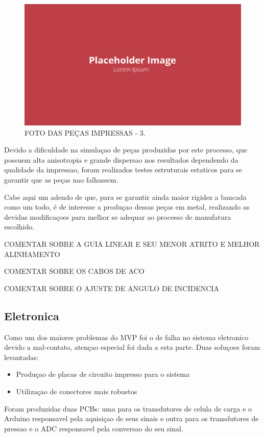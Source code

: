 \begin{figure}[!ht]
    \centering
    \includegraphics[width=.8\linewidth]{figuras/placeholder.png}
    \caption{FOTO DAS PEÇAS IMPRESSAS - 3\cite{autor}.}
    \label{fig:placeholder}
\end{figure}

Devido a dificuldade na simulaçao de peças produzidas por este processo, que possuem alta anisotropia e grande dispersao nos resultados dependendo da qualidade da impressao, foram realizados testes estruturais estaticos para se garantir que as peças nao falhassem. 

Cabe aqui um adendo de que, para se garantir ainda maior rigidez a bancada como um todo, é de interesse a produçao dessas peças em metal, realizando as devidas modificaçoes para melhor se adequar ao processo de manufatura escolhido.

COMENTAR SOBRE A GUIA LINEAR E SEU MENOR ATRITO E MELHOR ALINHAMENTO

COMENTAR SOBRE OS CABOS DE ACO

COMENTAR SOBRE O AJUSTE DE ANGULO DE INCIDENCIA

\subsection{Eletronica}

Como um dos maiores problemas do MVP foi o de falha no sistema eletronico devido a mal-contato, atençao especial foi dada a esta parte. Duas soluçoes foram levantadas:

\begin{itemize}
    \item Produçao de placas de circuito impresso para o sistema
    \item Utilizaçao de conectores mais robustos
\end{itemize}

Foram produzidas duas PCBs: uma para os transdutores de celula de carga e o Arduino responsavel pela aquisiçao de seus sinais e outra para os transdutores de pressao e o ADC responsavel pela conversao do seu sinal.

